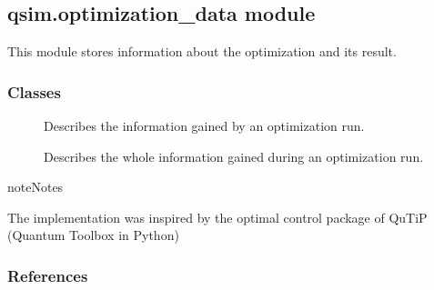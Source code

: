 \documentclass[letterpaper,10pt,english]{sphinxmanual}
\begin{document}
\subsection{qsim.optimization\_data module}
\label{\detokenize{qsim:module-qsim.optimization_data}}\label{\detokenize{qsim:qsim-optimization-data-module}}
This module stores information about the optimization and its result.


\subsubsection{Classes}
\label{\detokenize{qsim:id24}}\begin{description}
\item[{{\hyperref[\detokenize{qsim:qsim.optimization_data.OptimizationResult}]{}}}] \leavevmode
Describes the information gained by an optimization run.

\item[{{\hyperref[\detokenize{qsim:qsim.optimization_data.OptimizationSummary}]{}}}] \leavevmode
Describes the whole information gained during an optimization run.

\end{description}

\begin{sphinxadmonition}{note}{Notes}

The implementation was inspired by the optimal control package of QuTiP 
(Quantum Toolbox in Python)
\end{sphinxadmonition}
\subsubsection*{References}
\end{document}
